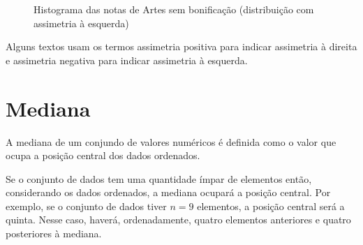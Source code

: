 \begin{figure}[H]
\centering
\capstart

\caption{Histograma das notas de Artes sem bonificação (distribuição com assimetria à esquerda)}

\label{\detokenize{PE104-1:fig-assimetriaaesquerda}}\label{\detokenize{PE104-1:id15}}\end{figure}

Alguns textos usam os termos assimetria positiva para indicar assimetria à direita e assimetria negativa para indicar assimetria à esquerda.

\section{Mediana}

A mediana de um conjundo de valores numéricos é definida como o valor que ocupa a posição central dos dados ordenados.

Se o conjunto de dados tem uma quantidade ímpar de elementos então, considerando os dados ordenados, a mediana ocupará a posição central. Por exemplo, se o conjunto de dados tiver \(n=9\) elementos, a posição central será a quinta. Nesse caso, haverá, ordenadamente, quatro elementos anteriores e quatro posteriores à mediana.



